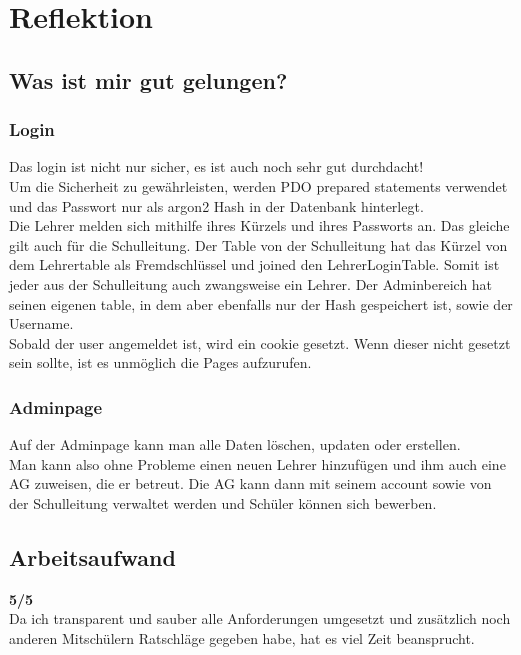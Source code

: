 \section{Reflektion}
\subsection{Was ist mir gut gelungen?}
\subsubsection{Login}
Das login ist nicht nur sicher, es ist auch noch sehr gut durchdacht!\\
Um die Sicherheit zu gewährleisten, werden PDO prepared statements verwendet und das Passwort nur als argon2 Hash in der Datenbank hinterlegt.\\
Die Lehrer melden sich mithilfe ihres Kürzels und ihres Passworts an. Das gleiche gilt auch für die Schulleitung. Der Table von der Schulleitung hat 
das Kürzel von dem Lehrertable als Fremdschlüssel und joined den LehrerLoginTable. Somit ist jeder aus der Schulleitung auch zwangsweise ein Lehrer.
Der Adminbereich hat seinen eigenen table, in dem aber ebenfalls nur der Hash gespeichert ist, sowie der Username.\\
Sobald der user angemeldet ist, wird ein cookie gesetzt. Wenn dieser nicht gesetzt sein sollte, ist es unmöglich die Pages aufzurufen.\\
\subsubsection{Adminpage}
Auf der Adminpage kann man alle Daten löschen, updaten oder erstellen.\\
Man kann also ohne Probleme einen neuen Lehrer hinzufügen und ihm auch eine AG zuweisen, die er betreut. Die AG kann dann mit seinem account sowie von der Schulleitung verwaltet werden und Schüler können sich bewerben.\\
\subsection{Arbeitsaufwand}
\textbf{5/5}\\
Da ich transparent und sauber alle Anforderungen umgesetzt und zusätzlich noch anderen Mitschülern Ratschläge gegeben habe, hat es viel Zeit beansprucht.
\newpage
